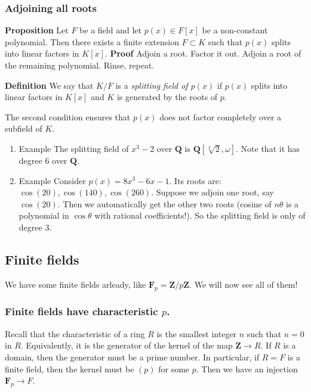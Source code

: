 \documentclass[11pt]{article}
\begin{document}
\subsubsection{Adjoining all roots}
\label{sec:org4277d6f}
\textbf{\textbf{Proposition}} Let \(F\) be a field and let \(p(x) \in F[x]\) be a non-constant polynomial.
Then there exists a finite extension \(F \subset K\) such that \(p(x)\) splits into linear factors in \(K[x]\).
\textbf{\textbf{Proof}} Adjoin a root.  Factor it out. Adjoin a root of the remaining polynomial.  Rinse, repeat.

\textbf{\textbf{Definition}} We say that \(K/F\) is a \emph{splitting field of \(p(x)\)} if \(p(x)\) splits into linear factors in \(K[x]\) and \(K\) is generated by the roots of \(p\).

The second condition ensures that \(p(x)\) does not factor completely over a subfield of \(K\).
\begin{enumerate}
\item Example
\label{sec:org245d375}
The splitting field of \(x^3-2\) over \(\mathbf{Q}\) is \(\mathbf{Q}[\sqrt[3]{2}, \omega]\).
Note that it has degree 6 over \(\mathbf{Q}\).
\item Example
\label{sec:org88a65ef}
Consider \(p(x) = 8x^3-6x-1\).
Its roots are: \(\cos(20), \cos(140), \cos(260)\).
Suppose we adjoin one root, say \(\cos(20)\).
Then we automatically get the other two roots (cosine of \(n\theta\) is a polynomial in \(\cos \theta\) with rational coefficients!).
So the splitting field is only of degree 3.
\end{enumerate}
\subsection{Finite fields}
\label{sec:org4965e00}
We have some finite fields arleady, like \(\mathbf{F}_p = \mathbf{Z} / p \mathbf{Z}\).
We will now see all of them!
\subsubsection{Finite fields have characteristic \(p\).}
\label{sec:org5ce5aed}
Recall that the characteristic of a ring \(R\) is the smallest integer \(n\) such that \(n = 0\) in \(R\).
Equivalently, it is the generator of the kernel of the map \(\mathbf{Z} \to R\).
If \(R\) is a domain, then the generator must be a prime number.
In particular, if \(R = F\) is a finite field, then the kernel must be \((p)\) for some \(p\).
Then we have an injection \(\mathbf{F}_p \to F\).
\end{document}
